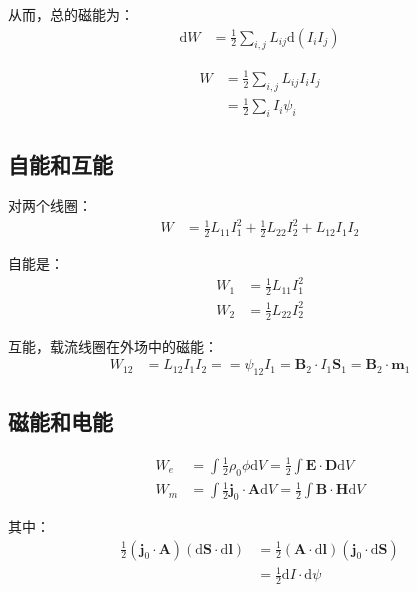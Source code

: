 \documentclass[12pt,onecolumn,a4paper]{book}
\numberwithin{table}{subsection}
\numberwithin{equation}{subsection}
\begin{document}
    从而，总的磁能为：
    \begin{align}
        \mathrm{d} W & = \frac{1}{2} \sum_{i,j} L_{ij} \mathrm{d}(I_i I_j)
    \end{align}

    \begin{align}
        W & = \frac{1}{2} \sum_{i,j} L_{ij} I_i I_j \\
          & = \frac{1}{2} \sum_{i} I_i\psi_i
    \end{align}

    \subsection{自能和互能}

    对两个线圈：
    \begin{align}
        W & = \frac{1}{2} L_{11} I_1^2 + \frac{1}{2} L_{22} I_2^2 + L_{12} I_1 I_2
    \end{align}

    自能是：
    \begin{align}
        W_1 & = \frac{1}{2} L_{11} I_1^2 \\
        W_2 & = \frac{1}{2} L_{22} I_2^2
    \end{align}

    互能，载流线圈在外场中的磁能：
    \begin{align}
        W_{12} & = L_{12} I_1 I_2 =  = \psi_{12} I_1 =  \mathbf{B}_2 \cdot I_1 \mathbf{S}_1 = \mathbf{B}_2 \cdot \mathbf{m}_1
    \end{align}

    \subsection{磁能和电能}

    \begin{align}
        W_e & = \int \frac{1}{2} \rho_0 \phi \mathrm{d} V = \frac{1}{2} \int \mathbf{E} \cdot \mathbf{D} \mathrm{d} V                  \\
        W_m & = \int \frac{1}{2} \mathbf{j}_0 \cdot\mathbf{A} \mathrm{d} V = \frac{1}{2} \int \mathbf{B} \cdot \mathbf{H} \mathrm{d} V
    \end{align}

    其中：
    \begin{align}
        \frac{1}{2} (\mathbf{j}_0 \cdot\mathbf{A}) (\mathrm{d} \mathbf{S} \cdot \mathrm{d} \mathbf{l}) & =\frac{1}{2}(\mathbf{A}\cdot\mathrm{d} \mathbf{l}) (\mathbf{j}_0\cdot \mathrm{d} \mathbf{S}  ) \\
                                                                                                       & =\frac{1}{2}\mathrm{d}I\cdot \mathrm{d}\psi
    \end{align}
\end{document}
